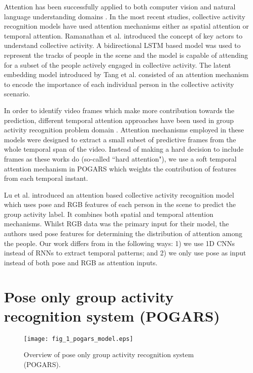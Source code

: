 \documentclass[a4paper,fleqn]{cas-dc}
\begin{document}
Attention has been successfully applied to both computer vision and natural language understanding domains \cite{Mnih2014_RNNforAtt,Xu2015_showAttendTell}. 
In the most recent studies, collective activity recognition models have used attention mechanisms either as spatial attention or temporal attention. 
Ramanathan et al. \cite{Ramanathan2016_keyperson} introduced the concept of key actors to understand collective activity. 
A bidirectional LSTM based model was used to represent the tracks of people in the scene and the model is capable of attending for a subset of the people actively engaged in collective activity. 
The latent embedding model introduced by Tang et al. \cite{Tang2017_latentEmbedding} consisted of an attention mechanism to encode the importance of each individual person in the collective activity scenario.

In order to identify video frames which make more contribution towards the prediction, different temporal attention approaches have been used in group activity recognition problem domain \cite{varona2000_automaticKeyFrame,Raptis2013_poselet_keyFrame}.
Attention mechanisms employed in these models were designed to extract a small subset of predictive frames from the whole temporal span of the video. 
Instead of making a hard decision to include frames as these works do (so-called ``hard attention"), we use a soft temporal attention mechanism in POGARS which weights the contribution of features from each temporal instant.

Lu et al.\cite{Lu2019_spatioTempAtt} introduced an attention based collective activity recognition model which uses pose and RGB features of each person in the scene to predict the group activity label. 
It combines both spatial and temporal attention mechanisms. 
Whilst RGB data was the primary input for their model, the authors used pose features for determining the distribution of attention among the people.
Our work differs from \cite{Lu2019_spatioTempAtt} in the following ways: 1) we use 1D CNNs instead of RNNs to extract temporal patterns; and 2) we only use pose as input instead of both pose and RGB as attention inputs.

\section{Pose only group activity recognition system (POGARS)}
\label{section-pogars}

\begin{figure}[pos=t]	
	\centering
	\texttt{[image: fig\_1\_pogars\_model.eps]}
	\caption{Overview of pose only group activity recognition system (POGARS).}
	\label{fig:pogars-model}
\end{figure}
\end{document}
